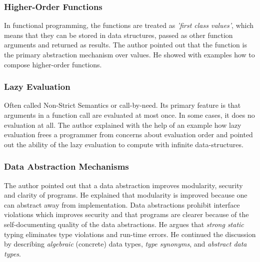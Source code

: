 \documentclass[12pt,twoside,a4paper]{report}
\begin{document}
\subsubsection{Higher-Order Functions}
In functional programming, the functions are treated as \textit{'first class values'}, which means that they can be stored in data structures, passed as other function arguments and returned as results. The author pointed out that the function is the primary abstraction mechanism over values. He showed with examples how to compose higher-order functions.

\subsubsection{Lazy Evaluation}
Often called Non-Strict Semantics or call-by-need. Its primary feature is that arguments in a function call are evaluated at most once. In some cases, it does no evaluation at all. The author
explained with the help of an example how lazy evaluation frees a programmer from concerns about evaluation order and pointed out the ability of the lazy evaluation to compute with infinite
data-structures.

\subsubsection{Data Abstraction Mechanisms}
The author pointed out that a data abstraction improves modularity, security and clarity of programs. He explained that modularity is improved because one can abstract away from
implementation. Data abstractions prohibit interface violations which improves security and that programs are clearer because of the self-documenting quality of the data abstractions. He argues
that \textit{strong static} typing eliminates type violations and run-time errors. He continued the discussion by describing \textit{algebraic} (concrete) data types, \textit{type synonyms}, and \textit{abstract data types}.
\end{document}
